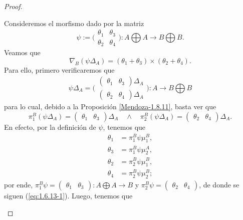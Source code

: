 \documentclass[tesis]{subfiles}
\begin{document}
\begin{proof}
\begin{itemize}
            Consideremos el morfismo dado por la matriz
            \[
                \psi:= \big( \begin{smallmatrix} \theta_1 &\theta_3 \\ \theta_2 &\theta_4 \end{smallmatrix}\big) : A\bigoplus A\to B\bigoplus B.
            \] 
            Veamos que
            \[
                \nabla_B(\psi\Delta_A) = (\theta_1+\theta_3)\times(\theta_2+\theta_4).
            \] 
            Para ello, primero verificaremos que
            \[
                \psi\Delta_A = \big( \begin{smallmatrix} (\begin{smallmatrix} \theta_1 &\theta_3 \end{smallmatrix}) \Delta_A \\ (\begin{smallmatrix} \theta_2 &\theta_4 \end{smallmatrix}) \Delta_A \end{smallmatrix}\big):A\to B\bigoplus B
            \] 
            para lo cual, debido a la Proposición \ref{Mendoza-1.8.11}, basta ver que
            \begin{equation}\label{eq:1.6.13-1}
                \pi_1^B(\psi\Delta_A) = (\begin{smallmatrix} \theta_1 &\theta_3  \end{smallmatrix})\Delta_A \quad \land \quad \pi_2^B(\psi\Delta_A) = (\begin{smallmatrix} \theta_2 &\theta_4 \end{smallmatrix})\Delta_A.
            \end{equation}
            En efecto, por la definición de $\psi$, tenemos que
            \begin{align*}
                \theta_1 &= \pi_1^B \psi \mu_1^B, \\
                \theta_3 &= \pi_1^B \psi \mu_2^A, \\
                \theta_2 &= \pi_2^B \psi \mu_1^B, \\
                \theta_4 &= \pi_2^B \psi \mu_2^B;
            \end{align*}
            por ende, $\pi_1^B\psi = (\begin{smallmatrix} \theta_1 &\theta_3 \end{smallmatrix}):A\bigoplus A\to B$ y $\pi_2^B\psi = (\begin{smallmatrix} \theta_2 &\theta_4 \end{smallmatrix})$, de donde se siguen (\ref{eq:1.6.13-1}). Luego, tenemos que

\end{itemize}
\end{proof}
\end{document}
